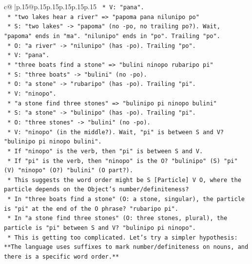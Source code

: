 \documentclass{article}
\begin{document}
{\begin{supertabular}{c@{$\;$}|p{.15\linewidth}@{}p{.15\linewidth}p{.15\linewidth}p{.15\linewidth}p{.15\linewidth}p{.15\linewidth}}
{{{\texttt{            *   V: "pana".} \\
\texttt{        *   "two lakes hear a river" => "papoma pana nilunipo po"} \\
\texttt{            *   S: "two lakes" {-}> "papoma" (no {-}po, no trailing po?). Wait, "papoma" ends in "ma". "nilunipo" ends in "po". Trailing "po".} \\
\texttt{            *   O: "a river" {-}> "nilunipo" (has {-}po). Trailing "po".} \\
\texttt{            *   V: "pana".} \\
\texttt{        *   "three boats find a stone" => "bulini ninopo rubaripo pi"} \\
\texttt{            *   S: "three boats" {-}> "bulini" (no {-}po).} \\
\texttt{            *   O: "a stone" {-}> "rubaripo" (has {-}po). Trailing "pi".} \\
\texttt{            *   V: "ninopo".} \\
\texttt{        *   "a stone find three stones" => "bulinipo pi ninopo bulini"} \\
\texttt{            *   S: "a stone" {-}> "bulinipo" (has {-}po). Trailing "pi".} \\
\texttt{            *   O: "three stones" {-}> "bulini" (no {-}po).} \\
\texttt{            *   V: "ninopo" (in the middle?). Wait, "pi" is between S and V? "bulinipo pi ninopo bulini".} \\
\texttt{            *   If "ninopo" is the verb, then "pi" is between S and V.} \\
\texttt{            *   If "pi" is the verb, then "ninopo" is the O? "bulinipo" (S) "pi" (V) "ninopo" (O?) "bulini" (O part?).} \\
\texttt{            *   This suggests the word order might be S {[}Particle{]} V O, where the particle depends on the Object's number/definiteness?} \\
\texttt{            *   In "three boats find a stone" (O: a stone, singular), the particle is "pi" at the end of the O phrase? "rubaripo pi".} \\
\texttt{            *   In "a stone find three stones" (O: three stones, plural), the particle is "pi" between S and V? "bulinipo pi ninopo".} \\
\texttt{            *   This is getting too complicated. Let's try a simpler hypothesis: **The language uses suffixes to mark number/definiteness on nouns, and there is a specific word order.**} \\
}}}
\end{supertabular}}
\end{document}
